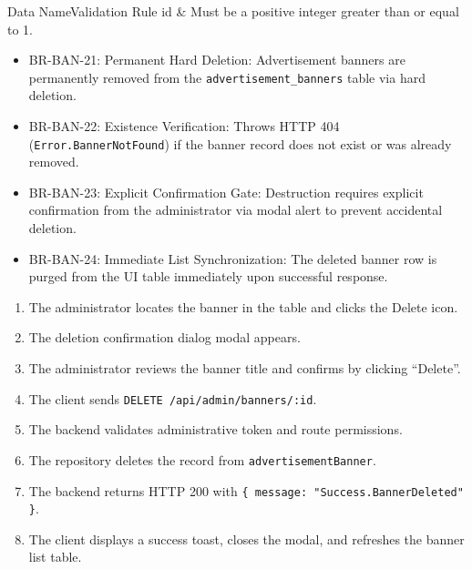 \begin{specdatatable}{Data Name}{Validation Rule}
id & Must be a positive integer greater than or equal to 1.\\ \hline
\end{specdatatable}

\begin{itemize}[leftmargin=1.6em,topsep=3pt,itemsep=2pt,parsep=0pt,label=$\bullet$]\brrulelist
    \item BR-BAN-21: Permanent Hard Deletion: Advertisement banners are permanently removed from the \texttt{advertisement\_banners} table via hard deletion.
    \item BR-BAN-22: Existence Verification: Throws HTTP 404 (\texttt{Error.BannerNotFound}) if the banner record does not exist or was already removed.
    \item BR-BAN-23: Explicit Confirmation Gate: Destruction requires explicit confirmation from the administrator via modal alert to prevent accidental deletion.
    \item BR-BAN-24: Immediate List Synchronization: The deleted banner row is purged from the UI table immediately upon successful response.
\end{itemize}

\begin{enumerate}[leftmargin=1.6em,topsep=3pt,itemsep=2pt,parsep=0pt]
    \item The administrator locates the banner in the table and clicks the Delete icon.
    \item The deletion confirmation dialog modal appears.
    \item The administrator reviews the banner title and confirms by clicking ``Delete''.
    \item The client sends \texttt{DELETE /api/admin/banners/:id}.
    \item The backend validates administrative token and route permissions.
    \item The repository deletes the record from \texttt{advertisementBanner}.
    \item The backend returns HTTP 200 with \texttt{\{ message: "Success.BannerDeleted" \}}.
    \item The client displays a success toast, closes the modal, and refreshes the banner list table.
\end{enumerate}


